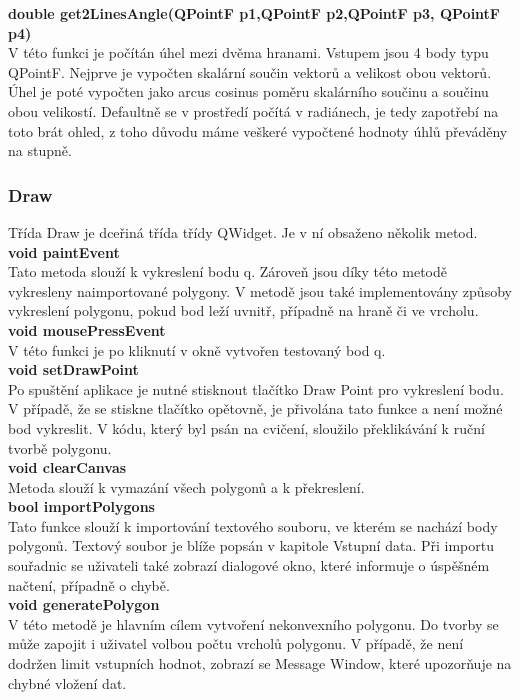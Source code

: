 \documentclass[a4paper, 12pt]{article}
\begin{document}
\textbf{double get2LinesAngle(QPointF p1,QPointF p2,QPointF p3, QPointF p4)}\\
V této funkci je počítán úhel mezi dvěma hranami. Vstupem jsou 4 body typu QPointF. Nejprve je vypočten skalární součin vektorů a velikost obou vektorů. Úhel je poté vypočten jako arcus cosinus poměru skalárního součinu a součinu obou velikostí. Defaultně se v prostředí počítá v radiánech, je tedy zapotřebí na toto brát ohled, z toho důvodu máme veškeré vypočtené hodnoty úhlů převáděny na stupně. \\


\subsubsection{Draw}
Třída Draw je dceřiná třída třídy QWidget. Je v ní obsaženo několik metod.\\

\textbf{void paintEvent}\\
Tato metoda slouží k vykreslení bodu q. Zároveň jsou díky této metodě vykresleny naimportované polygony. V metodě jsou také implementovány způsoby vykreslení polygonu, pokud bod leží uvnitř, případně na hraně či ve vrcholu.\\

\textbf{void mousePressEvent}\\
V této funkci je po kliknutí v okně vytvořen testovaný bod q.\\

\textbf{void setDrawPoint}\\
Po spuštění aplikace je nutné stisknout tlačítko Draw Point pro vykreslení bodu. V případě, že se stiskne tlačítko opětovně, je přivolána tato funkce a není možné bod vykreslit. V kódu, který byl psán na cvičení, sloužilo překlikávání k ruční tvorbě polygonu.\\

\textbf{void clearCanvas}\\
Metoda slouží k vymazání všech polygonů a k překreslení. \\

\textbf{bool importPolygons}\\
Tato funkce slouží k importování textového souboru, ve kterém se nachází body polygonů. Textový soubor je blíže popsán v kapitole Vstupní data. Při importu souřadnic se uživateli také zobrazí dialogové okno, které informuje o úspěšném načtení, případně o chybě.\\

\textbf{void generatePolygon}\\
V této metodě je hlavním cílem vytvoření nekonvexního polygonu. Do tvorby se může zapojit i uživatel volbou počtu vrcholů polygonu. V případě, že není dodržen limit vstupních hodnot, zobrazí se Message Window, které upozorňuje na chybné vložení dat.
\end{document}
